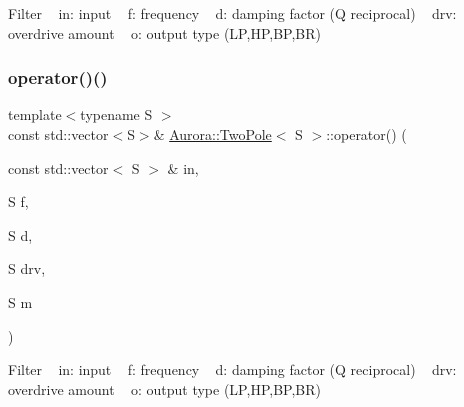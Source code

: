 Filter ~\newline
in\+: input ~\newline
f\+: frequency ~\newline
d\+: damping factor (Q reciprocal) ~\newline
drv\+: overdrive amount ~\newline
o\+: output type (LP,HP,BP,BR) \mbox{\label{class_aurora_1_1_two_pole_a93e4be5b3f2d85de446070a18deaf2dc}} 
\subsubsection{\texorpdfstring{operator()()}{operator()()}\hspace{0.1cm}{\footnotesize\ttfamily [2/4]}}
{\footnotesize\ttfamily template$<$typename S $>$ \\
const std\+::vector$<$S$>$\& \hyperlink{class_aurora_1_1_two_pole}{Aurora\+::\+Two\+Pole}$<$ S $>$\+::operator() (\begin{DoxyParamCaption}\item[{const std\+::vector$<$ S $>$ \&}]{in,  }\item[{S}]{f,  }\item[{S}]{d,  }\item[{S}]{drv,  }\item[{S}]{m }\end{DoxyParamCaption})\hspace{0.3cm}{\ttfamily [inline]}}

Filter ~\newline
in\+: input ~\newline
f\+: frequency ~\newline
d\+: damping factor (Q reciprocal) ~\newline
drv\+: overdrive amount ~\newline
o\+: output type (LP,HP,BP,BR) \mbox{\label{class_aurora_1_1_two_pole_a91d565b51049c31f2f663227c14b9301}} 
